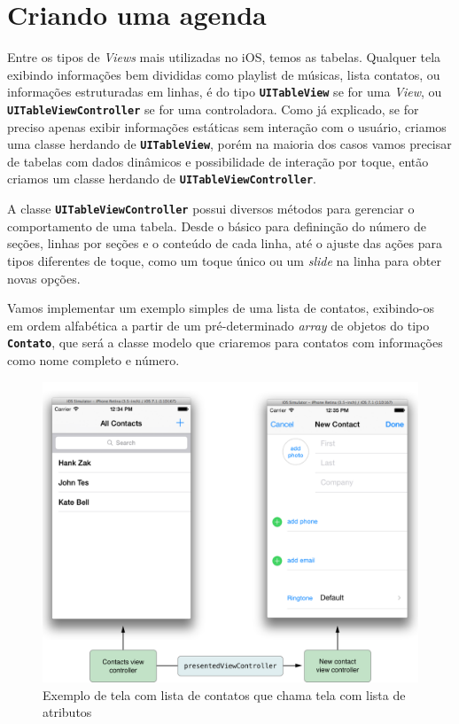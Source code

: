 \documentclass[a4paper,12pt,brazil,oneside]{book}
\begin{document}
\section{Criando uma agenda}

Entre os tipos de \emph{Views} mais utilizadas no iOS, temos as tabelas. Qualquer tela exibindo informações bem divididas como playlist de músicas, lista contatos, ou informações estruturadas em linhas, é do tipo \texttt{\textbf{UITableView}} se for uma \emph{View}, ou \texttt{\textbf{UITableViewController}} se for uma controladora. Como já explicado, se for preciso apenas exibir informações estáticas sem interação com o usuário, criamos uma classe herdando de \texttt{\textbf{UITableView}}, porém na maioria dos casos vamos precisar de tabelas com dados dinâmicos e possibilidade de interação por toque, então criamos um classe herdando de \texttt{\textbf{UITableViewController}}.

A classe \texttt{\textbf{UITableViewController}} possui diversos métodos para gerenciar o comportamento de uma tabela. Desde o básico para defininção do número de seções, linhas por seções e o conteúdo de cada linha, até o ajuste das ações para tipos diferentes de toque, como um toque único ou um \emph{slide} na linha para obter novas opções.

Vamos implementar um exemplo simples de uma lista de contatos, exibindo-os em ordem alfabética a partir de um pré-determinado \emph{array} de objetos do tipo \texttt{\textbf{Contato}}, que será a classe modelo que criaremos para contatos com informações como nome completo e número.

\begin{figure}[H]
  \centering
  \includegraphics[width=.75\textwidth]{figuras/apple_table_view_controller_contatos.png}
  \caption{Exemplo de tela com lista de contatos que chama tela com lista de atributos}
  \label{fig:a}
\end{figure}
\end{document}
